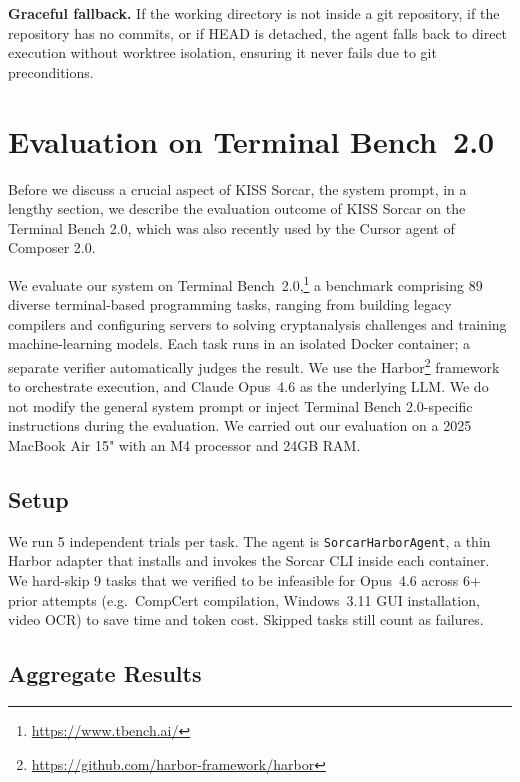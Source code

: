 \documentclass{article}
\begin{document}
\textbf{Graceful fallback.}  If the working directory is not inside a git repository, if the repository has no commits, or if HEAD is detached, the agent falls back to direct execution without worktree isolation, ensuring it never fails due to git preconditions.


\section{Evaluation on Terminal Bench~2.0}
\label{sec:evaluation}

Before we discuss a crucial aspect of KISS Sorcar, the system prompt, in a lengthy section, we describe the evaluation outcome of KISS Sorcar on the Terminal Bench 2.0, which was also recently used by the Cursor agent of Composer 2.0.

We evaluate our system on Terminal Bench~2.0,\footnote{\url{https://www.tbench.ai/}} a benchmark comprising 89 diverse terminal-based programming tasks, ranging from building legacy compilers and configuring servers to solving cryptanalysis challenges and training machine-learning models.  Each task runs in an isolated Docker container; a separate verifier automatically judges the result.  We use the Harbor\footnote{\url{https://github.com/harbor-framework/harbor}} framework to orchestrate execution, and Claude Opus~4.6 as the underlying LLM.  We do not modify the general system prompt or inject Terminal Bench 2.0-specific instructions during the evaluation.  We carried out our evaluation on a 2025 MacBook Air 15" with an M4 processor and 24GB RAM.

\subsection{Setup}

We run 5 independent trials per task.  The agent is \texttt{SorcarHarborAgent}, a thin Harbor adapter that installs and invokes the Sorcar CLI inside each container.  We hard-skip 9 tasks that we verified to be infeasible for Opus~4.6 across 6+ prior attempts (e.g.\ CompCert compilation, Windows~3.11 GUI installation, video OCR) to save time and token cost.  Skipped tasks still count as failures.

\subsection{Aggregate Results}
\end{document}
